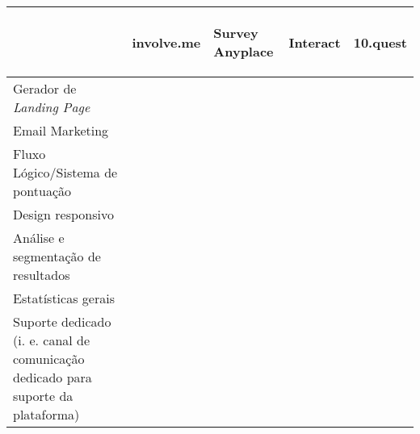 \renewcommand{\arraystretch}{2}
\setlength\arrayrulewidth{1pt}
\begin{table}[!ht]  
	\begin{center}
		\begin{tabular}{|p{4cm}|p{0.1cm}|p{0.1cm}|p{0.1cm}|p{0.1cm}|}
			\cline{2-5}
			\multicolumn{1}{c|}{} & \hspace{0.2cm}\begin{sideways}involve.me\end{sideways} & \hspace{0.4cm}\begin{sideways}Survey Anyplace\end{sideways} & \hspace{0.2cm}\begin{sideways}Interact\end{sideways} &\hspace{0.2cm}\begin{sideways} 10.quest\end{sideways}\\ \hline
			
			Gerador de \textit{Landing Page}  &\cellcolor{red!80}  & \cellcolor{red!80} & \cellcolor{green!80} & \cellcolor{green!80}  \\ \hline
			
			Email Marketing &\cellcolor{red!80}  & \cellcolor{green!80} & \cellcolor{green!80} & \cellcolor{green!80}  \\ \hline
			
			Fluxo Lógico/Sistema de pontuação &\cellcolor{yellow!80}  & \cellcolor{green!80} & \cellcolor{green!80} & \cellcolor{green!80}  \\ \hline
			
			Design responsivo & \cellcolor{green!80}  & \cellcolor{green!80} & \cellcolor{green!80} & \cellcolor{green!80}  \\ \hline			
			
			Análise e segmentação de resultados & \cellcolor{green!80}  & \cellcolor{green!80}  & \cellcolor{green!80} & \cellcolor{green!80} \\ \hline
			
			Estatísticas gerais & \cellcolor{yellow!80}  & \cellcolor{red!80}  & \cellcolor{red!80} & \cellcolor{green!80} \\ \hline
			
			Suporte dedicado (i. e. canal de comunicação dedicado para suporte da plataforma) & \cellcolor{green!80}  & \cellcolor{green!80}  & \cellcolor{green!80} & \cellcolor{green!80} \\ \hline
			

\end{tabular}
\end{center}
\end{table}
